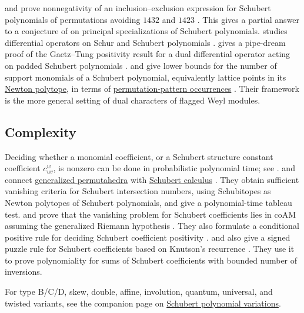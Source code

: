  and  prove nonnegativity of an
inclusion--exclusion expression for Schubert polynomials of permutations
avoiding $1432$ and $1423$ \cite{MeszarosTanjaya2021x}.  This gives a partial
answer to a conjecture of  on principal specializations of
Schubert polynomials.
 studies differential operators on Schur and Schubert
polynomials \cite{Nenashev2020x}.
 gives a pipe-dream proof of the Gaetz--Tung positivity
result for a dual differential operator acting on padded Schubert polynomials
\cite{Dennin2025x}.
 and  give lower bounds for the number
of support monomials of a Schubert polynomial, equivalently lattice points in
its \hyperref[newtonPolytope]{Newton polytope}, in terms of
\hyperref[permutationPattern]{permutation-pattern occurrences}
\cite{GuoLin2024x}.  Their framework is the more general setting of dual
characters of flagged Weyl modules.



\subsection[schubertComplexity]{Complexity}

Deciding whether a monomial coefficient, or a Schubert structure constant
coefficient $c^w_{uv}$, is nonzero can be done in probabilistic polynomial
time; see \cite{AdveRobichauxYong2021x,PakRobichaux2025xII}.
 and  connect
\hyperref[generalizedPermutohedron]{generalized permutahedra} with
\hyperref[schubertCalculus]{Schubert calculus}
\cite{DizierYong2020SchubertPermutahedra}.  They obtain sufficient vanishing
criteria for Schubert intersection numbers, using Schubitopes as Newton
polytopes of Schubert polynomials, and give a polynomial-time tableau test.
 and  prove that the vanishing problem
for Schubert coefficients lies in $\mathrm{coAM}$ assuming the generalized
Riemann hypothesis \cite{PakRobichaux2024Vanishing}.  They also formulate a
conditional positive rule for deciding Schubert coefficient positivity
\cite{PakRobichaux2024Positivity}.
 and  also give a signed puzzle rule
for Schubert coefficients based on Knutson's recurrence
\cite{PakRobichaux2025SignedPuzzles}.  They use it to prove polynomiality
for sums of Schubert coefficients with bounded number of inversions.


For type B/C/D, skew, double, affine, involution, quantum, universal, and
twisted variants, see the companion page on
\hyperref[schubertVariations]{Schubert polynomial variations}.
